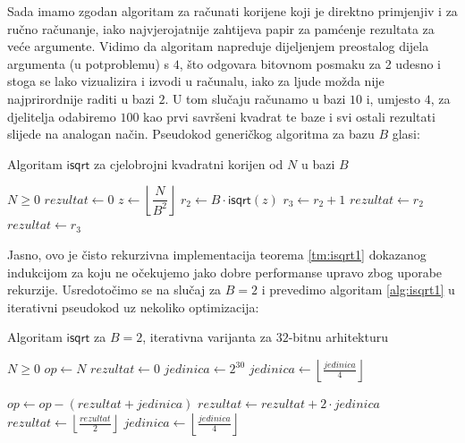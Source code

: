 \documentclass[12pt]{scrartcl}
\begin{document}
Sada imamo zgodan algoritam za računati korijene koji je direktno primjenjiv i za ručno računanje, iako najvjerojatnije zahtijeva papir
za pamćenje rezultata za veće argumente. Vidimo da algoritam napreduje dijeljenjem preostalog dijela argumenta (u potproblemu) s $4$, što
odgovara bitovnom posmaku za 2 udesno i stoga se lako vizualizira i izvodi u računalu, iako za ljude možda nije najprirordnije raditi u bazi $2$.
U tom slučaju računamo u bazi $10$ i, umjesto $4$, za djelitelja odabiremo $100$ kao prvi savršeni kvadrat te baze i svi ostali rezultati slijede
na analogan način. Pseudokod generičkog algoritma za bazu $B$ glasi:
\begin{algorithm}
    \caption{Algoritam $\mathsf{isqrt}$ za cjelobrojni kvadratni korijen od $N$ u bazi $B$}\label{alg:isqrt1}
    \begin{algorithmic}
    \Require $N \geq 0$
        \State $rezultat \gets 0$
    \Else
        \State $z \gets \left\lfloor\dfrac{N}{B^2}\right\rfloor$
        \State $r_2 \gets B \cdot \mathsf{isqrt}(z)$
        \State $r_3 \gets r_2 + 1$
            \State $rezultat \gets r_2$
        \Else
            \State $rezultat \gets r_3$
        \EndIf
    \EndIf
    \end{algorithmic}
\end{algorithm}

Jasno, ovo je čisto rekurzivna implementacija teorema \eqref{tm:isqrt1} dokazanog indukcijom za koju ne očekujemo jako dobre performanse upravo zbog
uporabe rekurzije. Usredotočimo se na slučaj za $B=2$ i prevedimo algoritam \ref{alg:isqrt1} u iterativni pseudokod uz nekoliko optimizacija:
\begin{algorithm}
    \caption{Algoritam $\mathsf{isqrt}$ za $B=2$, iterativna varijanta za $32$-bitnu arhitekturu~\cite{guysqrt}}\label{alg:isqrt2}
    \begin{algorithmic}[1]
    \Require $N \geq 0$
    \State $op \gets N$
    \State $rezultat \gets 0$
    \State $jedinica \gets 2^{30}$
        \State $jedinica \gets \left\lfloor\frac{jedinica}{4}\right\rfloor$
    \EndWhile

            \State $op \gets op - (rezultat + jedinica)$
            \State $rezultat \gets rezultat + 2 \cdot jedinica$\label{line:rezupd}
        \EndIf
        \State $rezultat \gets \left\lfloor\frac{rezultat}{2}\right\rfloor$
        \State $jedinica \gets \left\lfloor\frac{jedinica}{4}\right\rfloor$
    \EndWhile
    \end{algorithmic}
\end{algorithm}
\end{document}
